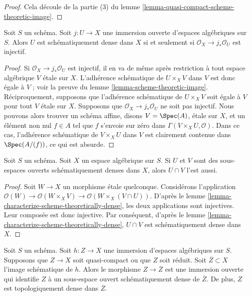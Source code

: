 \begin{proof}
Cela découle de la partie (3) du lemme \ref{lemma-quasi-compact-scheme-theoretic-image}.
\end{proof}

\begin{lemma}
\label{lemma-characterize-scheme-theoretically-dense}
Soit $S$ un schéma.
Soit $j : U \to X$ une immersion ouverte d'espaces algébriques sur $S$.
Alors $U$ est schématiquement dense dans $X$ si et seulement si
$\mathcal{O}_X \to j_*\mathcal{O}_U$ est injectif.
\end{lemma}

\begin{proof}
Si $\mathcal{O}_X \to j_*\mathcal{O}_U$ est injectif,
il en va de même après restriction à tout
espace algébrique $V$ étale sur $X$.
L'adhérence schématique de $U \times_X V$ dans $V$
est donc égale à $V$ ; voir la preuve du
lemme \ref{lemma-scheme-theoretic-image}.
Réciproquement, supposons que l'adhérence schématique
de $U \times_X V$ soit égale à $V$ pour tout $V$ étale sur $X$.
Supposons que $\mathcal{O}_X \to j_*\mathcal{O}_U$ ne soit pas injectif.
Nous pouvons alors trouver un schéma affine, disons $V = \Spec(A)$, étale sur $X$,
et un élément non nul $f \in A$ tel que $f$ s'envoie sur zéro dans
$\Gamma(V \times_X U, \mathcal{O})$. Dans ce cas, l'adhérence schématique
de $V \times_X U$ dans $V$ est clairement contenue dans $\Spec(A/(f))$,
ce qui est absurde.
\end{proof}

\begin{lemma}
\label{lemma-intersection-scheme-theoretically-dense}
Soit $S$ un schéma. Soit $X$ un espace algébrique sur $S$.
Si $U$ et $V$ sont des sous-espaces ouverts
schématiquement denses dans $X$, alors $U \cap V$ l'est aussi.
\end{lemma}

\begin{proof}
Soit $W \to X$ un morphisme étale quelconque. Considérons l'application
$\mathcal{O}(W) \to \mathcal{O}(W \times_X V)
\to \mathcal{O}(W \times_X (V \cap U))$.
D'après le lemme \ref{lemma-characterize-scheme-theoretically-dense},
les deux applications sont injectives. Leur composée est donc injective.
Par conséquent, d'après le lemme \ref{lemma-characterize-scheme-theoretically-dense},
$U \cap V$ est schématiquement dense dans $X$.
\end{proof}

\begin{lemma}
\label{lemma-quasi-compact-immersion}
Soit $S$ un schéma. Soit $h : Z \to X$ une immersion d'espaces algébriques
sur $S$. Supposons que $Z \to X$ soit quasi-compact ou que $Z$ soit réduit.
Soit $\overline{Z} \subset X$ l'image schématique de $h$.
Alors le morphisme $Z \to \overline{Z}$ est une immersion ouverte
qui identifie $Z$ à un sous-espace ouvert schématiquement dense
de $\overline{Z}$. De plus, $Z$ est topologiquement
dense dans $\overline{Z}$.
\end{lemma}

